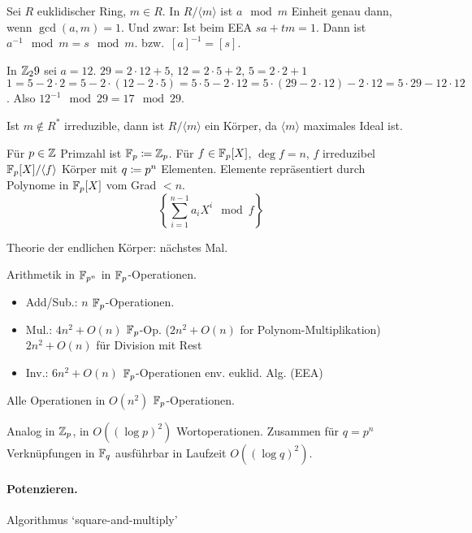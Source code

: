 \documentclass{article}
\begin{document}
\begin{theorem}
    Sei $R$ euklidischer Ring, $m\in R$. In $R/\langle m\rangle$ ist $a \mod m$ Einheit genau
    dann, wenn $\gcd(a,m)=1$. Und zwar: Ist beim EEA $sa+tm=1$. Dann ist $a^{-1}\mod m=s\mod
    m$. bzw.~$[a]^{-1}=[s]$.
\end{theorem}

\begin{example}
    In $\mathbb{Z}_29$ sei $a=12$. $29=2\cdot 12+5$, $12=2\cdot 5+2$, $5=2\cdot 2+1$\implies
    $1=5-2\cdot 2=5-2\cdot(12-2\cdot 5)=5\cdot 5 -2\cdot 12= 5\cdot(29-2\cdot 12)-2\cdot
    12=5\cdot 29-12\cdot 12$. Also $12^{-1}\mod 29 = 17 \mod 29$.
\end{example}

\begin{corollary}
    Ist $m\not\in R^\ast$ irreduzible, dann ist $R/\langle m\rangle$ ein Körper, da $\langle m\rangle$ maximales Ideal ist.
\end{corollary}

\begin{example}
    Für $p\in \mathbb{Z}$ Primzahl ist $\mathbb{F}_{p}\mathrel{\mathrel{\mathop:}\mkern-1.2mu=} \mathbb{Z}_p$. Für $f\in\mathbb{F}_{p}[X]$, $\deg
    f=n$, $f$ irreduzibel $\mathbb{F}_{p}[X]/\langle f\rangle$ Körper mit $q\mathrel{\mathrel{\mathop:}\mkern-1.2mu=} p^n$
    Elementen. Elemente repräsentiert durch Polynome in $\mathbb{F}_{p}[X]$ vom Grad $<n$.
    $$
    \left\{\sum_{i=1}^{n-1}{a_i X^i} \mod f\right\}
    $$
\end{example}

Theorie der endlichen Körper: nächstes Mal.

Arithmetik in $\mathbb{F}_{p^n}$ in $\mathbb{F}_{p}$-Operationen.

\begin{itemize}
        \item Add/Sub.: $n$ $\mathbb{F}_{p}$-Operationen.
        \item Mul.: $4n^2+O(n)$ $\mathbb{F}_{p}$-Op. ($2n^2+O(n)$ for Polynom-Multiplikation)
    $2n^2+O(n)$ für Division mit Rest 
        \item Inv.: $6n^2+O(n)$ $\mathbb{F}_{p}$-Operationen env. euklid. Alg. (EEA)
\end{itemize}

Alle Operationen in $O(n^2)$ $\mathbb{F}_{p}$-Operationen.

Analog in $\mathbb{Z}_p$, in $O((\log p)^2)$ Wortoperationen. Zusammen für $q=p^n$ Verknüpfungen
in $\mathbb{F}_{q}$ ausführbar in Laufzeit $O((\log q)^2)$.

\paragraph{Potenzieren.} Algorithmus `square-and-multiply'
\end{document}
